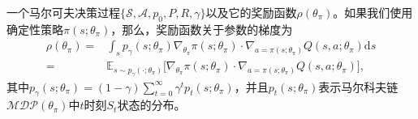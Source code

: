 \begin{theorem}
    一个马尔可夫决策过程$\{\mathcal{S}, \mathcal{A}, p_0, P, R, \gamma\}$以及它的奖励函数$\rho(\theta_\pi)$。如果我们使用确定性策略$\pi(s;\theta_\pi)$，那么，奖励函数关于参数的梯度为
    \begin{equation}
        \begin{aligned}
            \rho(\theta_\pi) =& \int_{s} p_{\gamma}(s; \theta_\pi) \nabla_{\theta_\pi} \pi(s; \theta_\pi) \cdot \nabla_{a = \pi(s;\theta_\pi)} Q(s, a; \theta_\pi) \mathrm{d} s \\
            =& \mathbb{E}_{s \sim p_{\gamma}(\cdot;\theta_\pi)}
            \bigg[\nabla_{\theta_\pi} \pi(s; \theta_\pi) \cdot \nabla_{a = \pi(s; \theta_\pi)} Q(s, a; \theta_\pi)\bigg],
        \end{aligned}
    \end{equation}
    其中$p_\gamma(s; \theta_\pi) = (1 - \gamma) \sum^{\infty}_{t=0} \gamma^t p_t(s; \theta_\pi)$，并且$p_t(s; \theta_\pi)$表示马尔科夫链$\mathcal{MDP}(\theta_\pi)$中$t$时刻$S_t$状态的分布。
\end{theorem}
